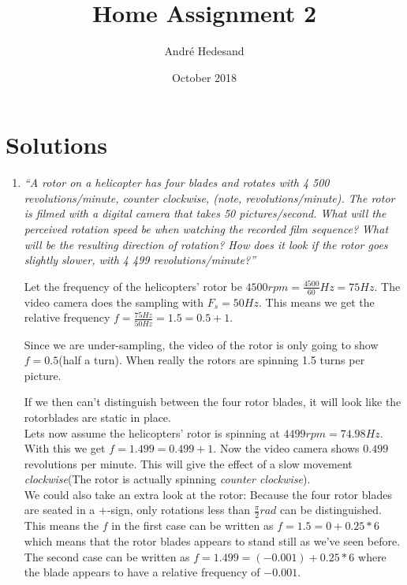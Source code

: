 \documentclass{article}
\title{Home Assignment 2}
\author{André Hedesand}
\date{October 2018}
\begin{document}
\maketitle
\thispagestyle{fancy}
\section*{Solutions}
\begin{enumerate}
    \item %
        \emph{``A rotor on a helicopter has four blades and rotates with 4 500 revolutions/minute, counter
            clockwise, (note, revolutions/minute). The rotor is filmed with a digital camera that takes 50
            pictures/second. What will the perceived rotation speed be when watching the recorded film sequence?
            What will be the resulting direction of rotation? How does it look if the rotor goes slightly 
            slower, with 4 499 revolutions/minute?''} 

        Let the frequency of the helicopters' rotor be $4500rpm = \frac{4500}{60}Hz = 75Hz$. 
        The video camera does the sampling with $F_s=50Hz$. This means we get the relative 
        frequency $f=\frac{75Hz}{50Hz}=1.5=0.5+1$.

        Since we are under-sampling, the video of the rotor is only going to show $f=0.5$(half 
        a turn). When really the rotors are spinning 1.5 turns per picture. 

        If we then can't distinguish between the four rotor blades, it will look like the     
        rotorblades are static in place.
        \\

        Lets now assume the helicopters' rotor is spinning at $4499rpm=74.98Hz$. With 
        this we get $f=1.499=0.499+1$. Now the video camera shows $0.499$ revolutions per     
        minute. This will give the effect of a slow movement \emph{clockwise}(The rotor is 
        actually spinning \emph{counter clockwise}).
        \\

        We could also take an extra look at the rotor: Because the four rotor blades are seated in a $+$-sign,
        only rotations less than $\frac{\pi}{2}rad$ can be distinguished. This means the $f$ in the first case 
        can be written as $f = 1.5 = 0 + 0.25 * 6$ which means that the rotor blades appears to stand still as 
        we've seen before. The second case can be written as $f = 1.499 = (-0.001) + 0.25 * 6$ where the blade 
        appears to have a relative frequency of $-0.001$.



\end{enumerate}
\end{document}

